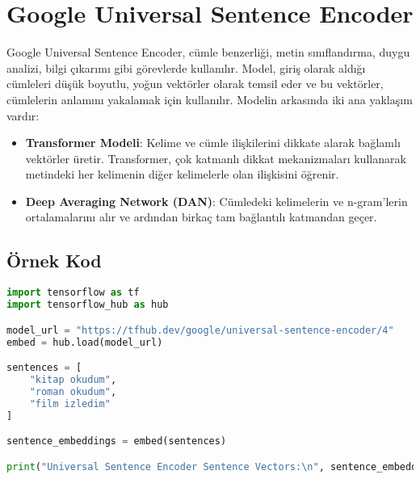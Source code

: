 \section{Google Universal Sentence Encoder}

Google Universal Sentence Encoder, cümle benzerliği, metin sınıflandırma, duygu analizi, bilgi çıkarımı gibi görevlerde kullanılır. Model, giriş olarak aldığı cümleleri düşük boyutlu, yoğun vektörler olarak temsil eder ve bu vektörler, cümlelerin anlamını yakalamak için kullanılır. Modelin arkasında iki ana yaklaşım vardır:

\begin{itemize}
    \item \textbf{Transformer Modeli}: Kelime ve cümle ilişkilerini dikkate alarak bağlamlı vektörler üretir. Transformer, çok katmanlı dikkat mekanizmaları kullanarak metindeki her kelimenin diğer kelimelerle olan ilişkisini öğrenir.
    \item \textbf{Deep Averaging Network (DAN)}: Cümledeki kelimelerin ve n-gram'lerin ortalamalarını alır ve ardından birkaç tam bağlantılı katmandan geçer.
\end{itemize}

\subsection{Örnek Kod}

\begin{lstlisting}[language=Python]
import tensorflow as tf
import tensorflow_hub as hub

model_url = "https://tfhub.dev/google/universal-sentence-encoder/4"
embed = hub.load(model_url)

sentences = [
    "kitap okudum",
    "roman okudum",
    "film izledim"
]

sentence_embeddings = embed(sentences)

print("Universal Sentence Encoder Sentence Vectors:\n", sentence_embeddings.numpy())
\end{lstlisting}

\newpage